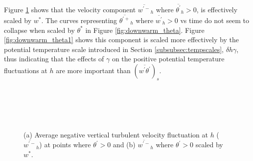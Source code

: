 Figure \ref{fig:downwarm_wvel} shows that the velocity component $\overline{w^{'-}}_{h}$  where $ \overline{\theta^{'}}_{h}>0$, is effectively scaled by $w^{*}$.  The curves representing $\overline{\theta^{'+}}_{h}$ where $\overline{w^{'}}_{h}>0$ vs time do not seem to collapse when scaled by $\theta^{*}$ in Figure \ref{fig:downwarm_theta}.  Figure \ref{fig:downwarm_theta1} shows this component is scaled more effectively by the potential temperature scale introduced in Section \ref{subsubsec:tempscales}, $\delta h \gamma$, thus indicating that the effects of $\gamma$ on the positive potential temperature fluctuations at $h$ are more important than $(\overline{w^{'}\theta^{'}})_{s}$.\\ 
\\   

\begin{figure}[htbp]
\begin{minipage}[b]{0.5\linewidth}
        \\
        \end{minipage}             
\quad
\begin{minipage}[b]{0.5\linewidth}
        \\       
       \end{minipage}
        \caption[Downward turbulent velocity Fluctuations at $h$]{(a) Average negative vertical turbulent velocity fluctuation at $h$ ($\overline{w^{\prime-}}_{h}$) at points where $\theta^{\prime}>0$ and (b) $\overline{w^{\prime-}}_{h}$ where $\theta^{\prime}>0$ scaled by $w^{*}$.}
        \label{fig:downwarm_wvel}
\end{figure}

